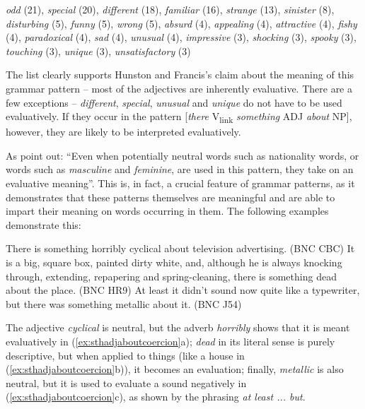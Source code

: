 \begin{exe}
\ex \textit{odd} (21), \textit{special} (20), \textit{different} (18), \textit{familiar} (16), \textit{strange} (13), \textit{sinister} (8), \textit{disturbing} (5), \textit{funny} (5), \textit{wrong} (5), \textit{absurd} (4), \textit{appealing} (4), \textit{attractive} (4), \textit{fishy} (4), \textit{paradoxical} (4), \textit{sad} (4), \textit{unusual} (4), \textit{impressive} (3), \textit{shocking} (3), \textit{spooky} (3), \textit{touching} (3), \textit{unique} (3), \textit{unsatisfactory} (3)
\label{ex:sthadjaboutgrampat}
\end{exe}

The list clearly supports Hunston and Francis's claim about the meaning  of this grammar  pattern  -- most of the adjectives  are inherently evaluative. There are a few exceptions -- \textit{different}, \textit{special}, \textit{unusual} and \textit{unique} do not have to be used evaluatively. If they occur in the pattern [\textit{there} V\textsubscript{link} \textit{something} ADJ \textit{about} NP], however, they are likely to be interpreted evaluatively.

As \citet[105]{hunston_pattern_2000} point out: ``Even when potentially neutral words such as nationality words, or words such as \textit{masculine} and \textit{feminine}, are used in this pattern, they take on an evaluative meaning''.  This is, in fact, a crucial feature of grammar  patterns,  as it demonstrates that these patterns themselves are meaningful and are able to impart their meaning on words occurring in them. The following examples demonstrate this:

\begin{exe}
\ex
\begin{xlist}
\label{ex:sthadjaboutcoercion}
\ex There is something horribly cyclical about television advertising. (BNC CBC)
\ex It is a big, square box, painted dirty white, and, although he is always knocking through, extending, repapering and spring\hyp{}cleaning, there is something dead about the place. (BNC HR9)
\ex At least it didn't sound now quite like a typewriter, but there was something metallic about it. (BNC J54)
\end{xlist}
\end{exe}

The adjective  \textit{cyclical} is neutral, but the adverb  \textit{horribly} shows that it is meant evaluatively in (\ref{ex:sthadjaboutcoercion}a); \textit{dead} in its literal  sense is purely descriptive,  but when applied to things (like a house in (\ref{ex:sthadjaboutcoercion}b)), it becomes an evaluation; finally, \textit{metallic} is also neutral, but it is used to evaluate a sound negatively in (\ref{ex:sthadjaboutcoercion}c), as shown by the phrasing \textit{at least ... but}.

